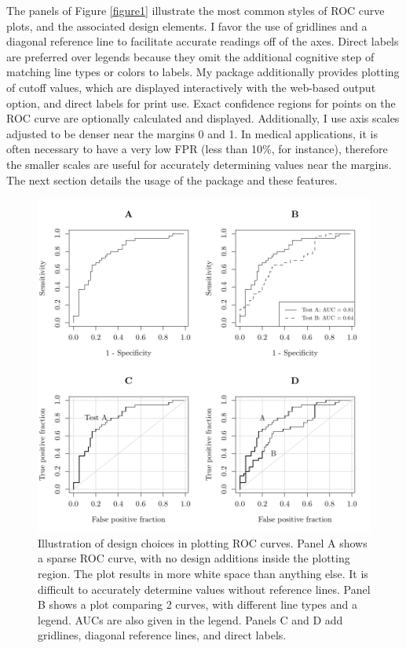 \documentclass[codesnippet]{jss}
\begin{document}
The panels of Figure \ref{figure1} illustrate the most common styles of
ROC curve plots, and the associated design elements. I favor the use of
gridlines and a diagonal reference line to facilitate accurate readings
off of the axes. Direct labels are preferred over legends because they
omit the additional cognitive step of matching line types or colors to
labels. My  package additionally provides plotting of
cutoff values, which are displayed interactively with the web-based
output option, and direct labels for print use. Exact confidence regions
for points on the ROC curve are optionally calculated and displayed.
Additionally, I use axis scales adjusted to be denser near the margins 0
and 1. In medical applications, it is often necessary to have a very low
FPR (less than 10\%, for instance), therefore the smaller scales are
useful for accurately determining values near the margins. The next
section details the usage of the   package and
these features.

\begin{Schunk}
\begin{figure}
\includegraphics{figure/figure1-1} \caption[Illustration of design choices in plotting ROC curves]{Illustration of design choices in plotting ROC curves. Panel A shows a sparse ROC curve, with no design additions inside the plotting region. The plot results in more white space than anything else. It is difficult to accurately determine values without reference lines. Panel B shows a plot comparing 2 curves, with different line types and a legend. AUCs are also given in the legend. Panels C and D add gridlines, diagonal reference lines, and direct labels. \label{figure1}}\label{fig:figure1}
\end{figure}
\end{Schunk}
\end{document}
